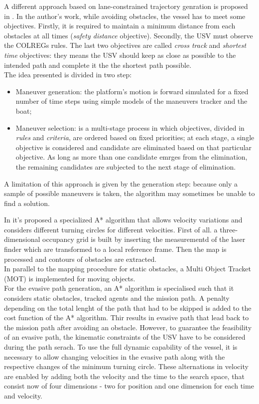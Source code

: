 \documentclass[journal]{IEEEtran}
\begin{document}
              A different approach based on lane-constrained trajectory genration is proposed in \cite{Tan2010}. In the author's work, while avoiding obstacles, the vessel has to meet some objectives. Firstly, it is required to maintain a minimum distance from each obstacles at all times (\textit{safety distance} objective). Secondly, the USV must observe the COLREGs rules. The last two objectives are called \textit{cross track} and \textit{shortest time} objectives: they means the USV should keep as close as possible to the intended path and complete it the the shortest path possible.\\
              The idea presented is divided in two step:
                    \begin{itemize}
                          \item Maneuver generation: the platform's motion is forward simulated for a fixed number of time steps using simple models of the maneuvers tracker and the boat;
                          \item Maneuver selection: is a multi-stage process in which objectives, divided in \textit{rules} and \textit{criteria}, are ordered based on fixed priorities; at each stage, a single objective is considered and candidate are eliminated based on that particular objective. As long as more than one candidate emrges from the elimination, the remaining candidates are subjected to the next stage of elimination.
                    \end{itemize}
              A limitation of this approach is given by the generation step: because only a sample of possible maneuvers is taken, the algorithm may sometimes be unable to find a solution.

              \indent In \cite{Blaich2015} it's proposed a specialized A* algorithm that allows velocity variations and considers different turning circles for different velocities. First of all. a three-dimensional occupancy grid is built by inserting the measurementd of the laser finder which are transformed to a local reference frame. Then the map is processed and contours of obstacles are extracted.\\
              In parallel to the mapping procedure for static obstacles, a Multi Object Tracket (MOT) is implemented for moving objects.\\
              For the evasive path generation, an A* algorithm is specialised such that it considers static obstacles, tracked agents and the mission path. A penalty depending on the total lenght of the path that had to be skipped is added to the cost function of the A* algorithm. Thir results in evasive path that lead back to the mission path after avoiding an obstacle. However, to guarantee the feasibility of an evasive path, the kinematic constraints of the USV have to be considered during the path serach. To use the full dynamic capability of the vessel, it is necessary to allow changing velocities in the evasive path along with the respective changes of the minimum turning circle. These alternations in velocity are enabled by adding both the velocity and the time to the search space, that consist now of four dimensions - two for position and one dimension for each time and velocity.
\end{document}
